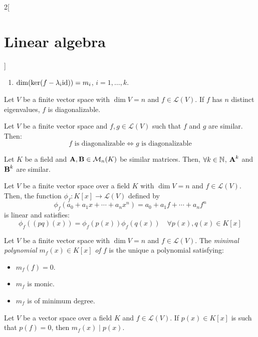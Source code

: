 \documentclass[../../../main.tex]{subfiles}
\begin{document}
\begin{multicols}{2}[\section{Linear algebra}]
\begin{theorem}
\begin{enumerate}
            \item $\dim(\ker(f-\lambda_i \mathrm{id}))=m_i$, $i=1,\ldots,k$.
        \end{enumerate}
    \end{theorem}
    \begin{corollary}
        Let $V$ be a finite vector space with $\dim V=n$ and $f\in\mathcal{L}(V)$. If $f$ has $n$ distinct eigenvalues, $f$ is diagonalizable.
    \end{corollary}
    \begin{prop}
        Let $V$ be a finite vector space and $f,g\in\mathcal{L}(V)$ such that $f$ and $g$ are similar. Then: $$f\text{ is diagonalizable}\iff g\text{ is diagonalizable}$$
    \end{prop}
    \begin{lemma}
        Let $K$ be a field and $\boldsymbol{\mathrm{A}},\boldsymbol{\mathrm{B}}\in\mathcal{M}_n(K)$ be similar matrices. Then, $\forall k\in\mathbb{N}$, $\boldsymbol{\mathrm{A}}^k$ and $\boldsymbol{\mathrm{B}}^k$ are similar.
    \end{lemma}
    \begin{lemma}
        Let $V$ be a finite vector space over a field $K$ with $\dim V=n$ and $f\in\mathcal{L}(V)$. Then, the function $\phi_f:K[x]\rightarrow\mathcal{L}(V)$ defined by $$\phi_f(a_0+a_1x+\cdots+a_nx^n)=a_0+a_1f+\cdots+a_nf^n$$
        is linear and satisfies: $$\phi_f((pq)(x))=\phi_f(p(x))\phi_f(q(x))\quad\forall p(x),q(x)\in K[x]$$
    \end{lemma}
    \begin{definition}
        Let $V$ be a finite vector space with $\dim V=n$ and $f\in\mathcal{L}(V)$. The \textit{minimal polynomial $m_f(x)\in K[x]$ of $f$} is the unique a polynomial satisfying:
        \begin{itemize}
            \item $m_f(f)=0$.
            \item $m_f$ is monic.
            \item $m_f$ is of minimum degree.
        \end{itemize}
    \end{definition}
    \begin{prop}
        Let $V$ be a vector space over a field $K$ and $f\in\mathcal{L}(V)$. If $p(x)\in K[x]$ is such that $p(f)=0$, then $m_f(x)\mid p(x)$.
    \end{prop}

\end{multicols}
\end{document}
